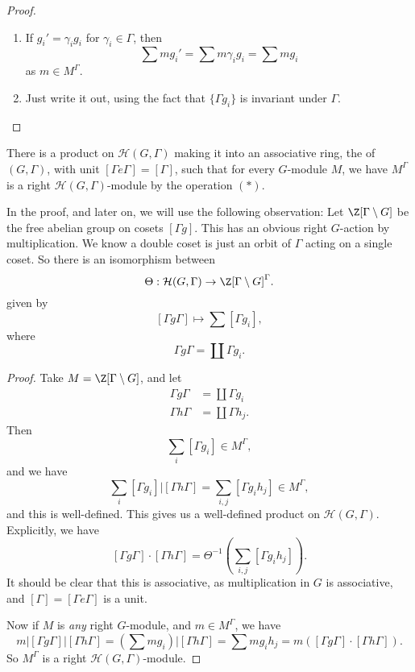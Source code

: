 \documentclass[a4paper]{article}
\begin{document}
\begin{proof}\leavevmode
  \begin{enumerate}
    \item If $g_i' = \gamma_i g_i$ for $\gamma_i \in \Gamma$, then
      \[
        \sum m g_i' = \sum m \gamma_i g_i = \sum m g_i
      \]
      as $m \in M^\Gamma$.
    \item Just write it out, using the fact that $\{\Gamma g_i\}$ is invariant under $\Gamma$.
  \end{enumerate}
\end{proof}

\begin{thm}
  There is a product on $\mathcal{H}(G, \Gamma)$ making it into an associative ring, the  of $(G, \Gamma)$, with unit $[\Gamma e \Gamma] = [\Gamma]$, such that for every $G$-module $M$, we have $M^\Gamma$ is a right $\mathcal{H}(G, \Gamma)$-module by the operation $(*)$.
\end{thm}

In the proof, and later on, we will use the following observation: Let $\Z[\Gamma\setminus G]$ be the free abelian group on cosets $[\Gamma g]$. This has an obvious right $G$-action by multiplication. We know a double coset is just an orbit of $\Gamma$ acting on a single coset. So there is an isomorphism between
\[
  \Theta: \mathcal{H}(G, \Gamma) \to \Z[\Gamma \setminus G]^\Gamma.
\]
given by
\[
  [\Gamma g \Gamma] \mapsto \sum [\Gamma g_i],
\]
where
\[
  \Gamma g \Gamma = \coprod \Gamma g_i.
\]
\begin{proof}
  Take $M = \Z[\Gamma \setminus G]$, and let
  \begin{align*}
    \Gamma g \Gamma &= \coprod \Gamma g_i\\
    \Gamma h \Gamma &= \coprod \Gamma h_j.
  \end{align*}
  Then
  \[
    \sum_i [\Gamma g_i] \in M^\Gamma,
  \]
  and we have
  \[
    \sum_i [\Gamma g_i] | [\Gamma h \Gamma] = \sum_{i, j} [\Gamma g_i h_j] \in M^\Gamma,
  \]
  and this is well-defined. This gives us a well-defined product on $\mathcal{H}(G, \Gamma)$. Explicitly, we have
  \[
    [\Gamma g \Gamma] \cdot [\Gamma h \Gamma] = \Theta^{-1}\left(\sum_{i, j} [\Gamma g_i h_j]\right).
  \]
  It should be clear that this is associative, as multiplication in $G$ is associative, and $[\Gamma] = [\Gamma e \Gamma]$ is a unit.

  Now if $M$ is \emph{any} right $G$-module, and $m \in M^\Gamma$, we have
  \[
    m|[\Gamma g \Gamma] | [\Gamma h \Gamma] = \left(\sum m g_i\right)|[\Gamma h \Gamma] = \sum m g_i h_j = m ([\Gamma g \Gamma] \cdot [\Gamma h \Gamma]).
  \]
  So $M^\Gamma$ is a right $\mathcal{H}(G, \Gamma)$-module.
\end{proof}
\end{document}
